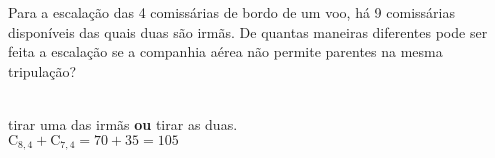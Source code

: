 \begin{ex}
Para a escalação das 4 comissárias de bordo de um voo, há 9 comissárias disponíveis das quais duas são irmãs. De quantas maneiras diferentes pode ser feita a escalação se a companhia aérea não permite parentes na mesma tripulação? 
  \begin{sol}
   \phantom{A}\\
   tirar uma das irmãs \textbf{ou} tirar as duas. \\
   $\mathrm{C}_{8,4}+\mathrm{C}_{7,4}=70+35=105$
  \end{sol}
\end{ex}